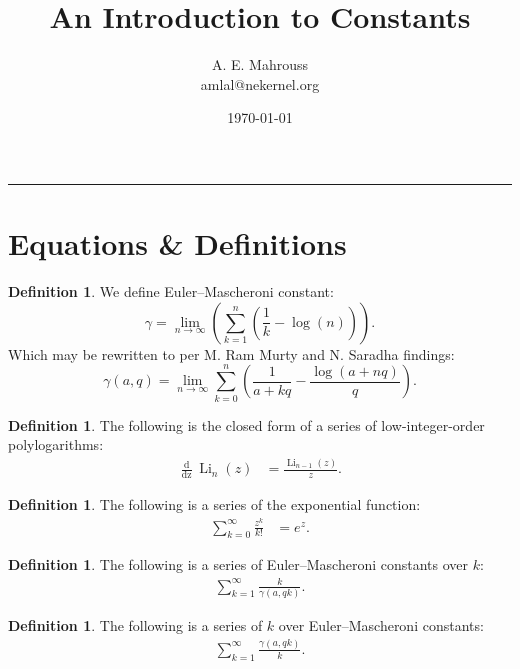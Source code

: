 \documentclass[10pt]{article}
\title{%
	\vspace{-1.5em}%
	\large\textbf{An Introduction to Constants}%
}
\author{A. E. Mahrouss\\amlal@nekernel.org}
\date{\today}
\theoremstyle{plain}
\theoremstyle{definition}
\newtheorem{definition}[theorem]{Definition}
\theoremstyle{remark}
\begin{document}
	
		\maketitle
\vspace{-0.5em}
\vspace{0.8em}
\rule{\linewidth}{0.4pt}
\vspace{1em}
	
	
	\section{Equations \& Definitions}
	
	\begin{definition}
		We define Euler–Mascheroni constant:
		\begin{equation}
			\gamma = \lim_{n \to \infty}(\sum_{k=1}^{n}(\frac{1}{k}-\log(n))).
		\end{equation}
		Which may be rewritten to per M. Ram Murty and N. Saradha findings:
		\begin{equation}
			\gamma(a, q) = \lim_{n \to \infty}\sum_{k=0}^{n}(\frac{1}{a+kq}-\frac{\log(a+nq)}{q}).
		\end{equation}
	\end{definition}
	
	\begin{definition}
		The following is the closed form of a series of low-integer-order polylogarithms:
		\begin{align*}
			\frac{\operatorname{d}}{\operatorname{dz}} \operatorname{Li}_{n}(z) &= \frac{\operatorname{Li}_{n-1}(z)}{z}.
		\end{align*}
	\end{definition}
	
	\begin{definition}
		The following is a series of the exponential function:
		\begin{align*}
			\sum_{k=0}^{\infty} \frac{z^k}{k!} &= e^{z}.
		\end{align*}
	\end{definition}
	
	\begin{definition}
		The following is a series of Euler–Mascheroni constants over $k$:
		\begin{align*}
			\sum_{k=1}^{\infty} \frac{k}{\gamma(a, qk)}.
		\end{align*}
	\end{definition}
	
	\begin{definition}
		The following is a series of $k$ over Euler–Mascheroni constants:
		\begin{align*}
			\sum_{k=1}^{\infty} \frac{\gamma(a, qk)}{k}.
		\end{align*}
	\end{definition}
	
\end{document}
